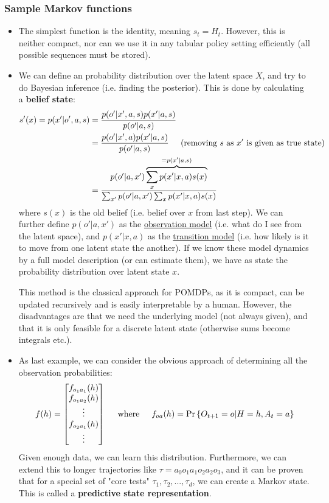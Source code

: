 \subsubsection{Sample Markov functions}
\begin{itemize}
	\item The simplest function is the identity, meaning $s_t=H_t$. However, this is neither compact, nor can we use it in any tabular policy setting efficiently (all possible sequences must be stored).
	\item We can define an probability distribution over the latent space $X$, and try to do Bayesian inference (i.e. finding the posterior). This is done by calculating a \textbf{belief state}:
	\begin{equation*}
		\begin{split}
			s'(x)=p(x'|o',a,s)& =\frac{p(o'|x',a,s)p(x'|a,s)}{p(o'|a,s)}\\
			& = \frac{p(o'|x',a)p(x'|a,s)}{p(o'|a,s)}\hspace{5mm}\text{(removing $s$ as $x'$ is given as true state)}\\
			& = \frac{p(o'|a,x')\overbrace{\sum_x p(x'|x,a)s(x)}^{=p(x'|a,s)}}{\sum_{x'}p(o'|a,x')\sum_x p(x'|x,a)s(x)}
		\end{split}
	\end{equation*}
	where $s(x)$ is the old belief (i.e. belief over $x$ from last step). We can further define $p(o'|a,x')$ as the \underline{observation model} (i.e. what do I see from the latent space), and $p(x'|x,a)$ as the \underline{transition model} (i.e. how likely is it to move from one latent state the another). If we know these model dynamics by a full model description (or can estimate them), we have as state the probability distribution over latent state $x$.
	
	This method is the classical approach for POMDPs, as it is compact, can be updated recursively and is easily interpretable by a human. However, the disadvantages are that we need the underlying model (not always given), and that it is only feasible for a discrete latent state (otherwise sums become integrals etc.).
	\item As last example, we can consider the obvious approach of determining all the observation probabilities:
	$$f(h)=\begin{bmatrix}
	f_{o_1a_1}(h)\\ f_{o_1a_2}(h)\\\vdots\\f_{o_2a_1}(h)\\\vdots\\
	\end{bmatrix}\hspace{5mm}\text{where}\hspace{5mm}f_{oa}(h)=\Pr\left\{O_{t+1}=o|H=h,A_t=a\right\}$$
	Given enough data, we can learn this distribution. Furthermore, we can extend this to longer trajectories like $\tau=a_0o_1a_1o_2a_2o_3$, and it can be proven that for a special set of "core tests" $\tau_1,\tau_2,...,\tau_d$, we can create a Markov state. This is called a \textbf{predictive state representation}.
	

\end{itemize}
